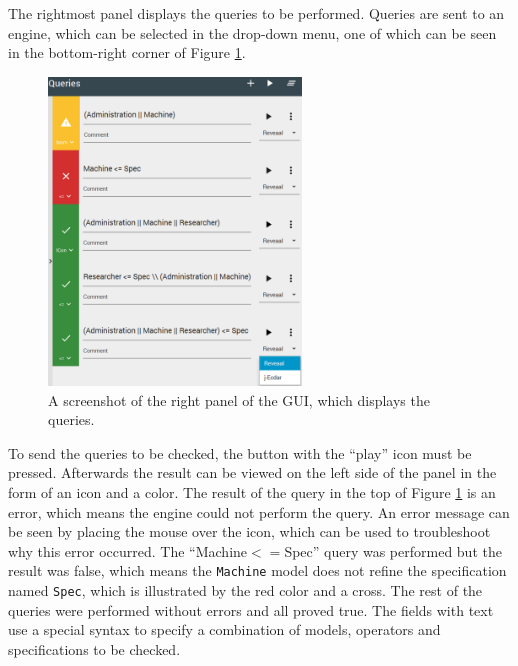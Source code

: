The rightmost panel displays the queries to be performed. 
Queries are sent to an engine, which can be selected in the drop-down menu, one of which can be seen in the bottom-right corner of Figure \ref{fig:ECDAR-queries-panel}. 
\begin{figure}[H]
    \centering
    \includegraphics[width=0.6\textwidth]{common/figures/right-panel.png}
    \caption{A screenshot of the right panel of the GUI, which displays the queries.}
    \label{fig:ECDAR-queries-panel}
\end{figure}
To send the queries to be checked, the button with the ``play'' icon must be pressed.
Afterwards the result can be viewed on the left side of the panel in the form of an icon and a color. 
The result of the query in the top of Figure \ref{fig:ECDAR-queries-panel} is an error, which means the engine could not perform the query. 
An error message can be seen by placing the mouse over the icon, which can be used to troubleshoot why this error occurred.
The ``Machine$<=$Spec'' query was performed but the result was false, which means the \texttt{Machine} model does not refine the specification named \texttt{Spec}, which is illustrated by the red color and a cross.
The rest of the queries were performed without errors and all proved true. 
The fields with text use a special syntax to specify a combination of models, operators and specifications to be checked.

